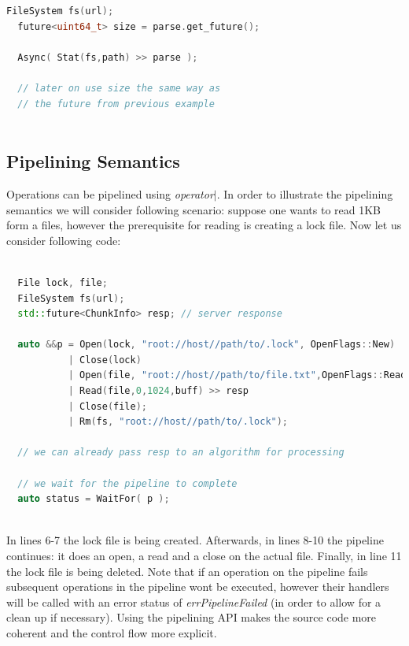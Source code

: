 \documentclass{article}
\begin{document}
\begin{itemize}
\begin{samepage}
\begin{lstlisting}[language=C++, xleftmargin=\dimexpr-\leftmargini]
  FileSystem fs(url);
  future<uint64_t> size = parse.get_future();

  Async( Stat(fs,path) >> parse );

  // later on use size the same way as 
  // the future from previous example
  
\end{lstlisting}
            
            \end{samepage}

        \end{itemize}
	
	\subsection{Pipelining Semantics}
	
	Operations can be pipelined using \textit{operator$\vert$}. In order to illustrate the pipelining semantics we will consider following scenario:
	suppose one wants to read 1KB form a files, however the prerequisite for reading is creating a lock file. Now let us consider following code:

\begin{lstlisting}[language=C++, xleftmargin=\dimexpr-\leftmargini]
		
  File lock, file;
  FileSystem fs(url);
  std::future<ChunkInfo> resp; // server response

  auto &&p = Open(lock, "root://host//path/to/.lock", OpenFlags::New)
           | Close(lock)
           | Open(file, "root://host//path/to/file.txt",OpenFlags::Read) 
           | Read(file,0,1024,buff) >> resp 
           | Close(file);
           | Rm(fs, "root://host//path/to/.lock");
           
  // we can already pass resp to an algorithm for processing

  // we wait for the pipeline to complete
  auto status = WaitFor( p );
  
\end{lstlisting}

    In lines 6-7 the lock file is being created. Afterwards, in lines 8-10 the pipeline continues: it does an open, a read and a close on the actual file. Finally, 
    in line 11 the lock file is being deleted. Note that if an operation on the pipeline fails subsequent operations in the pipeline wont be executed, however their 
    handlers will be called with an error status of \textit{errPipelineFailed} (in order to allow for a clean up if necessary).
    Using the pipelining API makes the source code more coherent and the control flow more  explicit.
	
\end{document}
